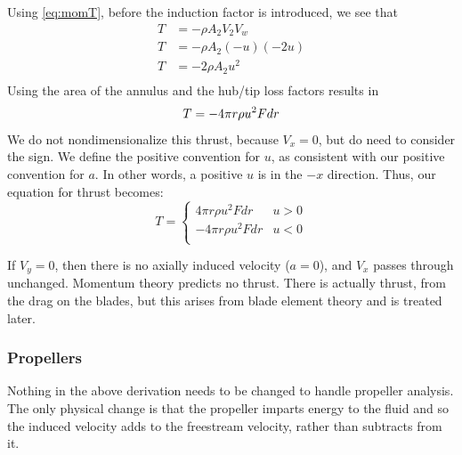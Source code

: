 \documentclass{article}
\begin{document}
Using \cref{eq:momT}, before the induction factor is introduced, we see that
\begin{equation}
    \begin{aligned}
        T &= -\rho A_2 V_2 V_w\\
        T &= -\rho A_2 (-u) (-2u)\\
        T &= - 2 \rho A_2 u^2\\
    \end{aligned}
\end{equation}
Using the area of the annulus and the hub/tip loss factors results in
\begin{equation}
    T = - 4 \pi r \rho u^2 F dr\\
\end{equation}
We do not nondimensionalize this thrust, because $V_x = 0$, but do need to consider the sign.  We define the positive convention for $u$, as consistent with our positive convention for $a$.  In other words, a positive $u$ is in the $-x$ direction.  Thus, our equation for thrust becomes:
\begin{equation}
    T =
    \begin{cases}
    4 \pi r \rho u^2 F dr & u > 0\\
    -4 \pi r \rho u^2 F dr & u < 0\\
    \end{cases}
\end{equation}

If $V_y = 0$, then there is no axially induced velocity ($a = 0$), and $V_x$ passes through unchanged. Momentum theory predicts no thrust.  There is actually thrust, from the drag on the blades, but this arises from blade element theory and is treated later.




\subsubsection{Propellers}

Nothing in the above derivation needs to be changed to handle propeller analysis.  The only physical change is that the propeller imparts energy to the fluid and so the induced velocity adds to the freestream velocity, rather than subtracts from it.
\end{document}
